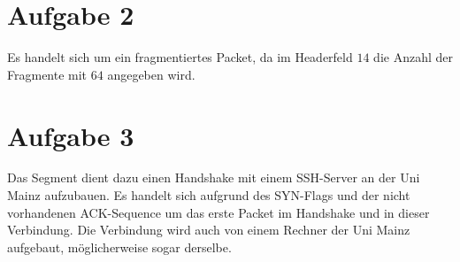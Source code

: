 \section{Aufgabe 2}
Es handelt sich um ein fragmentiertes Packet, da im Headerfeld $14$ die Anzahl
der Fragmente mit $64$ angegeben wird.

\section{Aufgabe 3}
Das Segment dient dazu einen Handshake mit einem SSH-Server an der Uni Mainz
aufzubauen. Es handelt sich aufgrund des SYN-Flags und der nicht vorhandenen
ACK-Sequence um das erste Packet im Handshake und in dieser Verbindung. Die
Verbindung wird auch von einem Rechner der Uni Mainz aufgebaut, möglicherweise
sogar derselbe.
